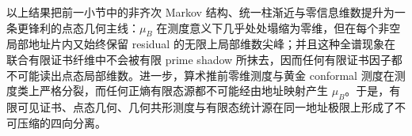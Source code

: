 


\noindent
以上结果把前一小节中的非齐次 Markov 结构、统一柱渐近与零信息维数提升为一条更锋利的点态几何主线：\(\mu_B\) 在测度意义下几乎处处塌缩为零维，但在每个非空局部地址片内又始终保留 residual 的无限上局部维数尖峰；并且这种全谱现象在联合有限证书纤维中不会被有限 prime shadow 所抹去，因而任何有限证书因子都不可能读出点态局部维数。进一步，算术推前零维测度与黄金 conformal 测度在测度类上严格分裂，而任何正熵有限态源都不可能经由地址映射产生 \(\mu_B\)。于是，有限可见证书、点态几何、几何共形测度与有限态统计源在同一地址极限上形成了不可压缩的四向分离。

\endinput
